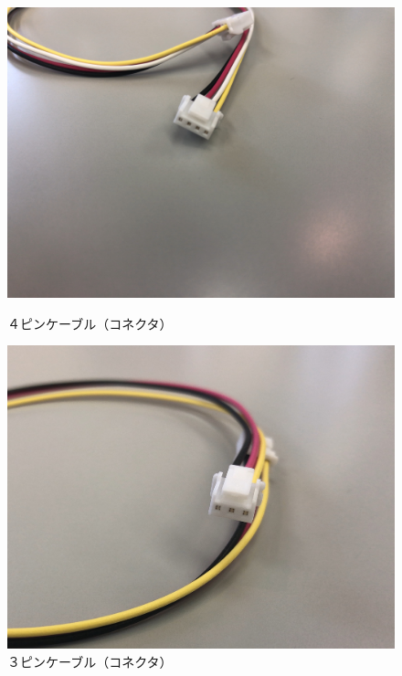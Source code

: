 \begin{figure}[H]
  \begin{minipage}[t]{0.48\columnwidth}
    \centering
 \includegraphics[width=0.8\hsize]{images/chap05/text05-img014.jpg}
    \caption{４ピンケーブル（コネクタ）}
  \end{minipage}
  \hspace{0.04\columnwidth} %
  \begin{minipage}[t]{0.48\columnwidth}
    \centering
    \includegraphics[width=0.8\hsize]{images/chap05/text05-img015.jpg}
    \caption{３ピンケーブル（コネクタ）}
  \end{minipage}
\end{figure}











